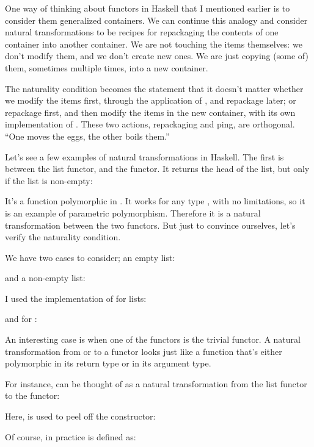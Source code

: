 One way of thinking about functors in Haskell that I mentioned earlier
is to consider them generalized containers. We can continue this analogy
and consider natural transformations to be recipes for repackaging the
contents of one container into another container. We are not touching
the items themselves: we don't modify them, and we don't create new
ones. We are just copying (some of) them, sometimes multiple times, into
a new container.

The naturality condition becomes the statement that it doesn't matter
whether we modify the items first, through the application of
, and repackage later; or repackage first, and then modify
the items in the new container, with its own implementation of
. These two actions, repackaging and ping, are
orthogonal. ``One moves the eggs, the other boils them.''

Let's see a few examples of natural transformations in Haskell. The
first is between the list functor, and the  functor. It
returns the head of the list, but only if the list is non-empty:

It's a function polymorphic in . It works for any type
, with no limitations, so it is an example of parametric
polymorphism. Therefore it is a natural transformation between the two
functors. But just to convince ourselves, let's verify the naturality
condition.

We have two cases to consider; an empty list:


and a non-empty list:


I used the implementation of  for lists:

and for :

An interesting case is when one of the functors is the trivial
 functor. A natural transformation from or to a
 functor looks just like a function that's either
polymorphic in its return type or in its argument type.

For instance,  can be thought of as a natural
transformation from the list functor to the  functor:

Here,  is used to peel off the 
constructor:

Of course, in practice  is defined as:

